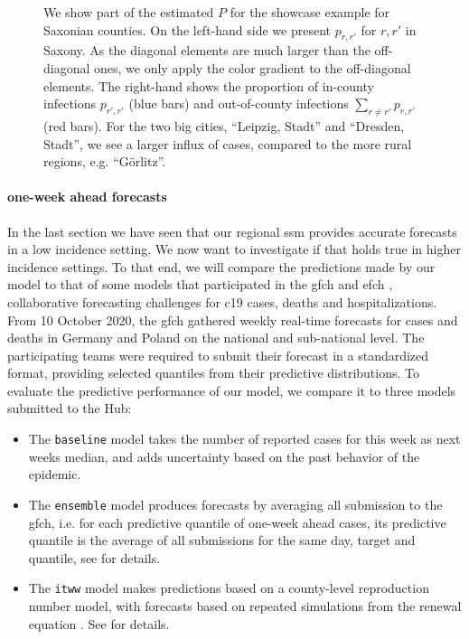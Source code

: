 \begin{figure}
    \resizebox{\textwidth}{!}{%
    }
    \caption{We show part of the estimated $P$ for the showcase example for Saxonian counties. On the left-hand side we present $p_{r,r'}$ for $r,r'$ in Saxony. As the diagonal elements are much larger than the off-diagonal ones, we only apply the color gradient to the off-diagonal elements. The right-hand shows the proportion of in-county infections $p_{r',r'}$ (blue bars) and out-of-county infections $\sum_{r \neq r'} p_{r,r'}$ (red bars). For the two big cities, ``Leipzig, Stadt'' and ``Dresden, Stadt'', we see a larger influx of cases, compared to the more rural regions, e.g. ``Görlitz''.} 
    \label{fig:P_matrix_saxony.tex}
\end{figure}


\paragraph{one-week ahead forecasts}

In the last section we have seen that our regional \acrshort{ssm} provides accurate forecasts in a low incidence setting. We now want to investigate if that holds true in higher incidence settings.
To that end, we will compare the predictions made by our model to that of some models that participated in the \acrlong{gfch} \citep{Bracher2021Preregistered,Bracher2022National} and \acrlong{efch} \citep{Sherratt2023Predictive}, collaborative forecasting challenges for \acrshort{c19} cases, deaths and hospitalizations.
From 10 October 2020, the \gls{gfch} gathered weekly real-time forecasts for cases and deaths in Germany and Poland on the national and sub-national level. The participating teams were required to submit their forecast in a standardized format, providing selected quantiles from their predictive distributions. To evaluate the predictive performance of our model, we compare it to three models submitted to the Hub:

\begin{itemize}
    \item The \texttt{baseline} model takes the number of reported cases for this week as next weeks median, and adds uncertainty based on the past behavior of the epidemic.
    \item The \texttt{ensemble} model produces forecasts by averaging all submission to the \acrlong{gfch}, i.e. for each predictive quantile of one-week ahead cases, its predictive quantile is the average of all submissions for the same day, target and quantile, see \citep{Sherratt2023Predictive} for details.
    \item The \texttt{itww} model makes predictions based on a county-level reproduction number model, with forecasts based on repeated simulations from the renewal equation . See \citep{Heyder2022Regional} for details.
\end{itemize}

